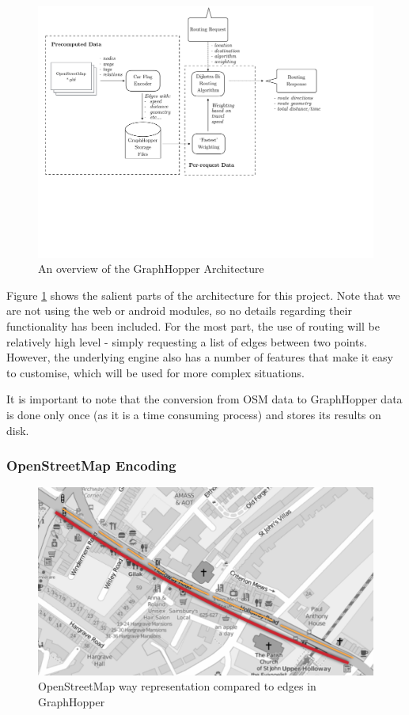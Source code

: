 \documentclass[ %
                    author={Alexander Hill},
                supervisor={Dr. Benjamin Sach},
                    degree={MEng},
                     title={MARMOSET},
                  subtitle={Multi-Agent Route Management using Online Simulation for Efficient Transportation},
                      type={research},
                      year={2016} ]{dissertation}
\begin{document}
\begin{figure}[p]
    \centering
    \includegraphics[scale=0.5,page=1,clip,trim=0 8cm 4cm 0]{architecture}
    \caption{An overview of the GraphHopper Architecture}\label{fig:gh-arch}
\end{figure}

Figure \ref{fig:gh-arch} shows the salient parts of the architecture for this
project.  Note that we are not using the web or android modules, so no details
regarding their functionality has been included. For the most part, the use of
routing will be relatively high level - simply requesting a list of edges
between two points. However, the underlying engine also has a number of features
that make it easy to customise, which will be used for more complex situations.

It is important to note that the conversion from OSM data to GraphHopper data is
done only once (as it is a time consuming process) and stores its results on
disk.

\subsubsection{OpenStreetMap Encoding}

\begin{figure}[p]
    \centering
    \includegraphics[scale=0.6]{osm-gh}
    \caption{OpenStreetMap way representation compared to edges in GraphHopper}\label{fig:osm-gh}
\end{figure}
\end{document}
